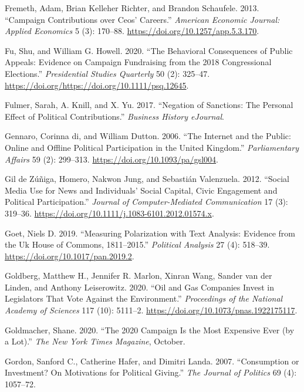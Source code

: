 \documentclass[12pt,]{article}
\begin{document}
\leavevmode\hypertarget{ref-fremeth2013}{}%
Fremeth, Adam, Brian Kelleher Richter, and Brandon Schaufele. 2013.
``Campaign Contributions over Ceos' Careers.'' \emph{American Economic
Journal: Applied Economics} 5 (3): 170--88.
\url{https://doi.org/10.1257/app.5.3.170}.

\leavevmode\hypertarget{ref-fu2020}{}%
Fu, Shu, and William G. Howell. 2020. ``The Behavioral Consequences of
Public Appeals: Evidence on Campaign Fundraising from the 2018
Congressional Elections.'' \emph{Presidential Studies Quarterly} 50 (2):
325--47. \url{https://doi.org/https://doi.org/10.1111/psq.12645}.

\leavevmode\hypertarget{ref-fulmer2017}{}%
Fulmer, Sarah, A. Knill, and X. Yu. 2017. ``Negation of Sanctions: The
Personal Effect of Political Contributions.'' \emph{Business History
eJournal}.

\leavevmode\hypertarget{ref-degennaro2006}{}%
Gennaro, Corinna di, and William Dutton. 2006. ``The Internet and the
Public: Online and Offline Political Participation in the United
Kingdom.'' \emph{Parliamentary Affairs} 59 (2): 299--313.
\url{https://doi.org/10.1093/pa/gsl004}.

\leavevmode\hypertarget{ref-zuniga2012}{}%
Gil de Zúñiga, Homero, Nakwon Jung, and Sebastián Valenzuela. 2012.
``Social Media Use for News and Individuals' Social Capital, Civic
Engagement and Political Participation.'' \emph{Journal of
Computer-Mediated Communication} 17 (3): 319--36.
\url{https://doi.org/10.1111/j.1083-6101.2012.01574.x}.

\leavevmode\hypertarget{ref-goet2019}{}%
Goet, Niels D. 2019. ``Measuring Polarization with Text Analysis:
Evidence from the Uk House of Commons, 1811--2015.'' \emph{Political
Analysis} 27 (4): 518--39. \url{https://doi.org/10.1017/pan.2019.2}.

\leavevmode\hypertarget{ref-goldberg2020}{}%
Goldberg, Matthew H., Jennifer R. Marlon, Xinran Wang, Sander van der
Linden, and Anthony Leiserowitz. 2020. ``Oil and Gas Companies Invest in
Legislators That Vote Against the Environment.'' \emph{Proceedings of
the National Academy of Sciences} 117 (10): 5111--2.
\url{https://doi.org/10.1073/pnas.1922175117}.

\leavevmode\hypertarget{ref-goldmacher2020}{}%
Goldmacher, Shane. 2020. ``The 2020 Campaign Is the Most Expensive Ever
(by a Lot).'' \emph{The New York Times Magazine}, October.

\leavevmode\hypertarget{ref-gordon2007}{}%
Gordon, Sanford C., Catherine Hafer, and Dimitri Landa. 2007.
``Consumption or Investment? On Motivations for Political Giving.''
\emph{The Journal of Politics} 69 (4): 1057--72.
\end{document}
